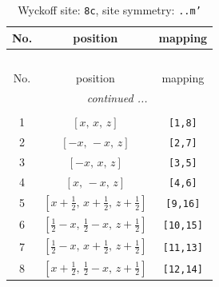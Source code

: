 \documentclass[fleqn,8pt]{jsarticle}
\begin{document}
\renewcommand{\arraystretch}{1.2}
\begin{longtable}{ccc}
\caption{Wyckoff site: {\tt 8c}, site symmetry: {\tt ..m'}}
 \\
 \hline \hline
No. & position & mapping \\ \hline \endfirsthead

\multicolumn{2}{l}{\tablename\ \thetable{}} \\
 \hline \hline
No. & position & mapping \\ \hline \endhead

 \hline \hline
\multicolumn{2}{r}{\footnotesize\it continued ...} \\ \endfoot

 \hline \hline
\multicolumn{2}{r}{} \\ \endlastfoot

1 & $\left[ x,\, x,\, z \right]$ & {\tt [1,8]} \\ \hline
2 & $\left[ - x,\, - x,\, z \right]$ & {\tt [2,7]} \\ \hline
3 & $\left[ - x,\, x,\, z \right]$ & {\tt [3,5]} \\ \hline
4 & $\left[ x,\, - x,\, z \right]$ & {\tt [4,6]} \\ \hline
5 & $\left[ x + \frac{1}{2},\, x + \frac{1}{2},\, z + \frac{1}{2} \right]$ & {\tt [9,16]} \\ \hline
6 & $\left[ \frac{1}{2} - x,\, \frac{1}{2} - x,\, z + \frac{1}{2} \right]$ & {\tt [10,15]} \\ \hline
7 & $\left[ \frac{1}{2} - x,\, x + \frac{1}{2},\, z + \frac{1}{2} \right]$ & {\tt [11,13]} \\ \hline
8 & $\left[ x + \frac{1}{2},\, \frac{1}{2} - x,\, z + \frac{1}{2} \right]$ & {\tt [12,14]} \\
\end{longtable}
\renewcommand{\arraystretch}{1.2}
\end{document}
